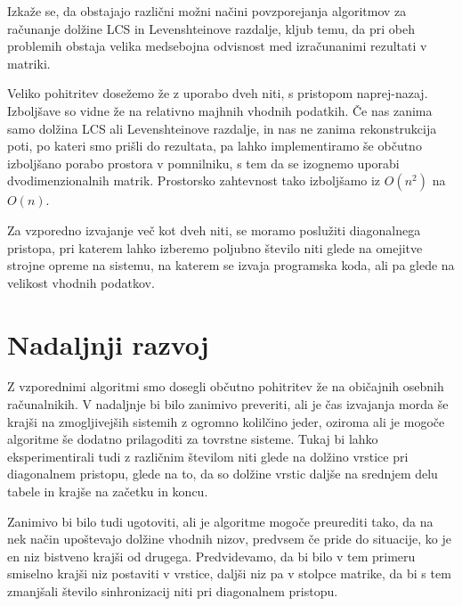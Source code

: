 \documentclass[a4paper,12pt,openright]{book}
\begin{document}
Izkaže se, da obstajajo različni možni načini povzporejanja algoritmov za računanje dolžine LCS in Levenshteinove razdalje, kljub temu, da pri obeh problemih obstaja velika medsebojna odvisnost med izračunanimi rezultati v matriki. 

Veliko pohitritev dosežemo že z uporabo dveh niti, s pristopom naprej-nazaj. Izboljšave so vidne že na relativno majhnih vhodnih podatkih. Če nas zanima samo dolžina LCS ali Levenshteinove razdalje, in nas ne zanima rekonstrukcija poti, po kateri smo prišli do rezultata, pa lahko implementiramo še občutno izboljšano porabo prostora v pomnilniku, s tem da se izognemo uporabi dvodimenzionalnih matrik. Prostorsko zahtevnost tako izboljšamo iz $O(n^2)$ na $O(n)$. 

Za vzporedno izvajanje več kot dveh niti, se moramo poslužiti diagonalnega pristopa, pri katerem lahko izberemo poljubno število niti glede na omejitve strojne opreme na sistemu, na katerem se izvaja programska koda, ali pa glede na velikost vhodnih podatkov. 

\section{Nadaljnji razvoj}

Z vzporednimi algoritmi smo dosegli občutno pohitritev že na običajnih osebnih računalnikih. V nadaljnje bi bilo zanimivo preveriti, ali je čas izvajanja morda še krajši na zmogljivejših sistemih z ogromno kolilčino jeder, oziroma ali je mogoče algoritme še dodatno prilagoditi za tovrstne sisteme. Tukaj bi lahko eksperimentirali tudi z različnim številom niti glede na dolžino vrstice pri diagonalnem pristopu, glede na to, da so dolžine vrstic daljše na srednjem delu tabele in krajše na začetku in koncu. 

Zanimivo bi bilo tudi ugotoviti, ali je algoritme mogoče preurediti tako, da na nek način upoštevajo dolžine vhodnih nizov, predvsem če pride do situacije, ko je en niz bistveno krajši od drugega. Predvidevamo, da bi bilo v tem primeru smiselno krajši niz postaviti v vrstice, daljši niz pa v stolpce matrike, da bi s tem zmanjšali število sinhronizacij niti pri diagonalnem pristopu. 




\raggedright




\printbibliography[heading=bibintoc,title={Literatura}]
\end{document}
